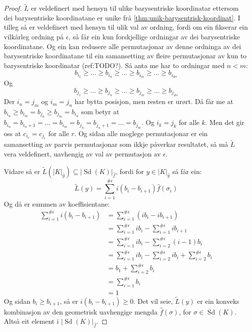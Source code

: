 \documentclass[a4paper, titlepage, 12pt, norsk]{article}
\theoremstyle{plain}
\theoremstyle{definition}
\newcommand{\gr}[1]{ \lvert #1 \rvert } %
\newcommand{\tuple}[1]{ \left( #1 \right) } %
\DeclareMathOperator{\Sd}{Sd}
\begin{document}
\begin{proof}
	\( \tilde{L} \) er veldefinert med hensyn til ulike barysentriske koordinatar ettersom dei barysentriske koordinatane er unike frå \autoref{thm:unik-barysentrisk-koordinat}. I tilleg så er veldefinert med hensyn til ulik val av ordning, fordi om ein fikserar ein vilkårleg ordning på \( \epsilon \), så får ein kun forskjellige ordningar av dei barysentriske koordinatane. Og ein kan redusere alle permutasjonar av denne ordninga av dei barysentriske koordinatane til ein samansetting av fleire permutasjonar av kun to barysentriske koordinatar (ref:TODO?). Så anta me har to ordningar med \( n < m \):
	\[
		b_{i_1} \geq \dots \geq b_{i_n} \geq \dots \geq b_{i_m} \geq \dots \geq b_{i_{\#\epsilon}}
	\]
	Og
	\[
		b_{j_1} \geq \dots \geq b_{j_n} \geq \dots \geq b_{j_m} \geq \dots \geq b_{j_{\#\epsilon}}
	\]
	Der \( i_n=j_m \) og \( i_m=j_n \) har bytta posisjon, men resten er urørt. Då får me at \( b_{i_n} \geq b_{i_m}=b_{j_n} \geq b_{j_m}=b_{i_n} \) som betyr at \( b_{i_n} = b_{i_n+1} = \dots = b_{i_m}=b_{j_n}=b_{j_n+1}=\dots=b_{j_m} \). Og \( i_k = j_k \) for alle \( k \). Men det gir oss at \( c_{i_r} = c_{j_r} \) for alle \( r \). Og sidan alle moglege permutasjonar er ein samansetting av parvis permutasjonar som ikkje påverkar resultatet, så må \( \tilde{L} \) vera veldefinert, uavhengig av val av permutasjon av \( \epsilon \).

	Vidare så er \( \tilde{L}(\gr{K}_{\hat{g}}) \subseteq \gr{\Sd(K)}_{\hat{f}} \), fordi for \( y \in \gr{K}_{\hat{g}} \) så får ein:
	\[
		\tilde{L}(y) = \sum_{i=1}^{\#\epsilon}i\tuple{b_i-b_{i+1}}\hat{f}(\sigma_i)
	\]
	Og då er summen av koeffisientane:
	\begin{align*}
		\sum_{i=1}^{\#\epsilon}i\tuple{b_i-b_{i+1}} &= \sum_{i=1}^{\#\epsilon}\tuple{ib_i-ib_{i+1}} \\
		&= \sum_{i=1}^{\#\epsilon}i b_i - \sum_{i=1}^{\#\epsilon}i b_{i+1} \\
		&= \sum_{i=1}^{\#\epsilon}i b_i - \sum_{i=2}^{\#\epsilon}\tuple{i-1}b_{i} \\
		&= \sum_{i=1}^{\#\epsilon}i b_i - \sum_{i=2}^{\#\epsilon}i b_{i} + \sum_{i=2}^{\#\epsilon}b_i \\
		&= b_1 + \sum_{i=2}^{\#\epsilon} b_i \\
		&= \sum_{i=1}^{\#\epsilon} b_i \\
		&= 1
	\end{align*}
	Og sidan \( b_i \geq b_{i+1} \), så er \( i\tuple{b_i-b_{i+1}} \geq 0 \). Det vil seie, \( \tilde{L}(y) \) er ein konveks kombinasjon av den geometrisk uavhengige mengda \( \hat{f}(\sigma) \), for \( \sigma \in \Sd(K) \). Altså eit element i \( \gr{\Sd(K)}_{\hat{f}} \).


\end{proof}
\end{document}
